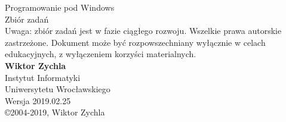 ﻿\begin{titlepage}
\begin{center}
\textsf{
\Huge Programowanie pod Windows\\
\Huge Zbiór zadań\\
\vspace*{1.5cm}
\small 
Uwaga: zbiór zadań jest w fazie ciągłego rozwoju. 
Wszelkie prawa autorskie zastrzeżone. Dokument może być rozpowszechniany wyłącznie w celach edukacyjnych,  
z wyłączeniem korzyści materialnych. \\
\vspace*{4.5cm}
\Large {\bf Wiktor Zychla}\\
\Large
Instytut Informatyki\\Uniwersytetu Wrocławskiego\\
\vspace{1.5cm}
\Large
Wersja 2019.02.25\\
\vfill
\copyright 2004-2019, Wiktor Zychla}
\end{center}
\end{titlepage}
